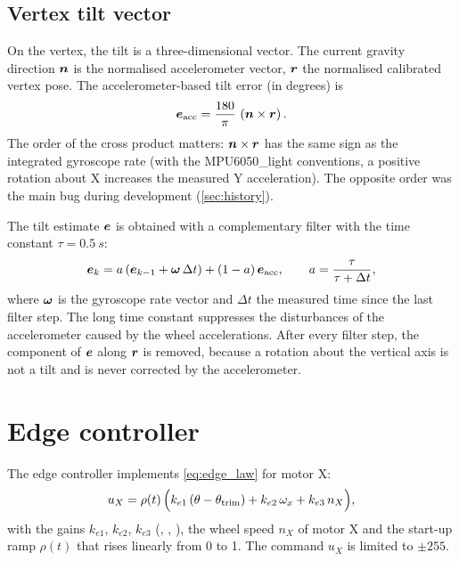 \subsection{Vertex tilt vector}

On the vertex, the tilt is a three-dimensional vector. The current gravity direction $\bm{n}$ is
the normalised accelerometer vector, $\bm{r}$ the normalised calibrated vertex pose. The
accelerometer-based tilt error (in degrees) is
\begin{equation}
  \bm{e}_\text{acc} = \frac{180}{\pi}\,\left(\bm{n}\times\bm{r}\right).
\end{equation}
The order of the cross product matters: $\bm{n}\times\bm{r}$ has the same sign as the
integrated gyroscope rate (with the MPU6050\_light conventions, a positive rotation about X
increases the measured Y acceleration). The opposite order was the main bug during development
(\cref{sec:history}).

The tilt estimate $\bm{e}$ is obtained with a complementary filter with the time constant
$\tau = \SI{0.5}{s}$:
\begin{equation}
  \bm{e}_k = a\left(\bm{e}_{k-1} + \bm{\omega}\,\Delta t\right) + (1-a)\,\bm{e}_\text{acc},
  \qquad a = \frac{\tau}{\tau + \Delta t},
  \label{eq:vertex_cf}
\end{equation}
where $\bm{\omega}$ is the gyroscope rate vector and $\Delta t$ the measured time since the last
filter step. The long time constant suppresses the disturbances of the accelerometer caused by the
wheel accelerations. After every filter step, the component of $\bm{e}$ along $\bm{r}$ is
removed, because a rotation about the vertical axis is not a tilt and is never corrected by the
accelerometer.

\section{Edge controller}
\label{sec:edge_controller}

The edge controller implements \cref{eq:edge_law} for motor X:
\begin{equation}
  u_X = \rho(t)\,\Bigl(k_{e1}\,(\theta - \theta_\text{trim}) + k_{e2}\,\omega_x + k_{e3}\,n_X\Bigr),
  \label{eq:edge_controller}
\end{equation}
with the gains $k_{e1}$, $k_{e2}$, $k_{e3}$ (, , ), the wheel speed
$n_X$ of motor X and the start-up ramp $\rho(t)$ that rises linearly from 0 to 1. The command
$u_X$ is limited to $\pm 255$.

